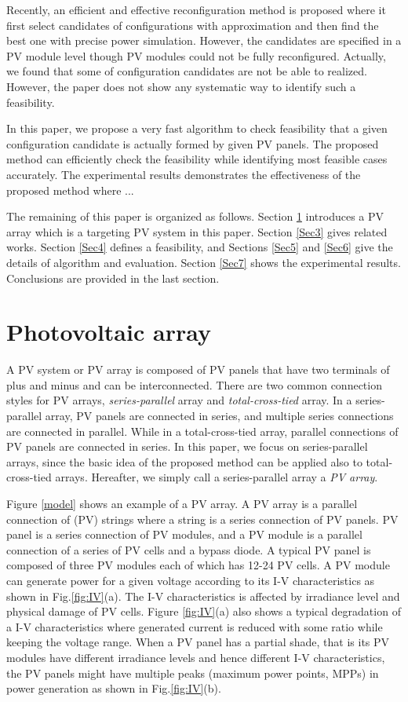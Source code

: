 \documentclass[conference]{IEEEtran}
\begin{document}
Recently, an efficient and effective reconfiguration method\cite{orozco2016optimized} is proposed where it first select candidates of configurations with approximation and then find the best one with precise power simulation. However, the candidates are specified in a PV module level though PV modules could not be fully reconfigured. Actually, we found that some of configuration candidates are not be able to realized. However, the paper\cite{orozco2016optimized}  does not show any systematic way to identify such a feasibility. 

In this paper, we propose a very fast algorithm to check feasibility that a given configuration candidate is actually formed by given PV panels. The proposed method can efficiently check the feasibility while identifying most feasible cases accurately. The experimental results demonstrates the effectiveness of the proposed method where ...

The remaining of this paper is organized as follows. Section \ref{Sec2} introduces a PV array which is a targeting PV system in this paper. Section \ref{Sec3} gives related works. Section \ref{Sec4} defines a feasibility, and Sections \ref{Sec5} and \ref{Sec6} give the details of algorithm and evaluation. Section \ref{Sec7} shows the experimental results. Conclusions are provided in the last section.

\section{Photovoltaic array}\label{Sec2}
A PV system or PV array is composed of PV panels that have two terminals of plus and minus and can be interconnected. There are two common connection styles for PV arrays, \textit{series-parallel} array and \textit{total-cross-tied} array. 
In a series-parallel array, PV panels are connected in series, and multiple series connections are connected in parallel. While in a total-cross-tied array, parallel connections of PV panels are connected in series. In this paper, we focus on series-parallel arrays, since the basic idea of the proposed method can be applied also to total-cross-tied arrays. Hereafter, we simply call a series-parallel array a \textit{PV array}. 

Figure \ref{model} shows an example of a PV array. A PV array is a parallel connection of (PV) strings where a string is a series connection of PV panels. PV panel is a series connection of PV modules, and a PV module is a parallel connection of a series of PV cells and a bypass diode. A typical PV panel is composed of three PV modules each of which has 12-24 PV cells. A PV module can generate power for a given voltage according to its I-V characteristics as shown in Fig.\ref{fig:IV}(a). The I-V characteristics is affected by irradiance level and physical damage of PV cells. Figure \ref{fig:IV}(a) also shows a typical degradation of a I-V characteristics where generated current is reduced with some ratio while keeping the voltage range. When a PV panel has a partial shade, that is its PV modules have different irradiance levels and hence different I-V characteristics, the PV panels might have multiple peaks (maximum power points, MPPs) in power generation as shown in Fig.\ref{fig:IV}(b). 
\end{document}
